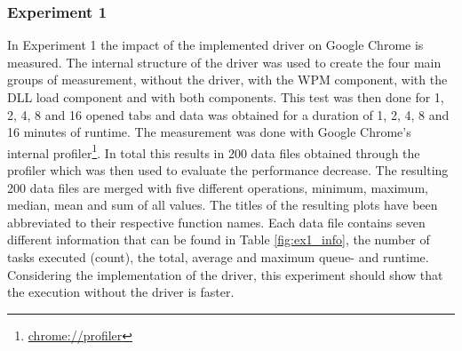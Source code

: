 \subsubsection{Experiment 1}
In Experiment 1 the impact of the implemented driver on Google Chrome is measured. The internal structure of the driver was used to create the four main groups of measurement, without the driver, with the \gls{WPM} component, with the \gls{DLL} load component and with both components. This test was then done for 1, 2, 4, 8 and 16 opened tabs and data was obtained for a duration of 1, 2, 4, 8 and 16 minutes of runtime. The measurement was done with Google Chrome's internal profiler\footnote{\url{chrome://profiler}}. In total this results in 200 data files obtained through the profiler which was then used to evaluate the performance decrease. The resulting 200 data files are merged with five different operations, minimum, maximum, median, mean and sum of all values. The titles of the resulting plots have been abbreviated to their respective function names. Each data file contains seven different information that can be found in Table \ref{fig:ex1_info}, the number of tasks executed (count), the total, average and maximum queue- and runtime. Considering the implementation of the driver, this experiment should show that the execution without the driver is faster.

